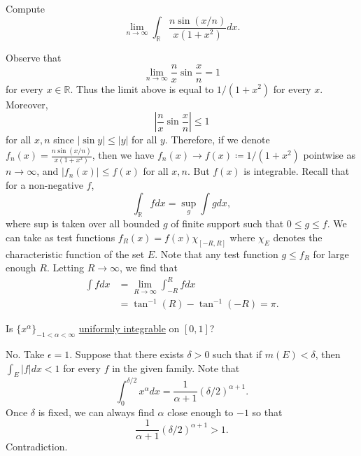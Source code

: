  \begin{exercise}
    Compute
    \begin{equation}
      \lim_{n\rightarrow\infty}\int_{\mathbb{R}}\frac{n\sin(x/n)}{x(1+x^{2})}dx.
    \end{equation}
  \end{exercise}
  \begin{solution}
    Observe that
    \begin{equation}
      \lim_{n\rightarrow\infty}\frac{n}{x}\sin\frac{x}{n}=1
    \end{equation}
    for every $x \in \mathbb{R}$. Thus the limit above is equal to $1/(1+x^{2})$ for every $x$. Moreover,
    \begin{equation}
      \left|\frac{n}{x}\sin\frac{x}{n}\right|\le1
    \end{equation}
    for all $x, n$ since $|\sin y| \le |y|$ for all $y$. Therefore, if we denote $f_n(x) = \frac{n \sin(x/n)}{x(1+x^2)}$, then we have $f_n(x) \rightarrow f(x) \coloneqq 1/(1+x^2)$ pointwise as $n \rightarrow \infty$, and $|f_n(x)| \le f(x)$ for all $x, n$. But $f(x)$ is integrable. Recall that for a non-negative $f$,
    \begin{equation}
      \int_{\mathbb{R}} f dx = \sup_g \int g dx,
    \end{equation}
    where sup is taken over all bounded $g$ of finite support such that $0 \le g \le f$. We can take as test functions $f_R(x) = f(x)\chi_{[-R,R]}$ where $\chi_E$ denotes the characteristic function of the set $E$. Note that any test function $g \le f_R$ for large enough $R$. Letting $R \rightarrow \infty$, we find that
    \begin{align}
      \int f dx &= \lim_{R\rightarrow\infty} \int_{-R}^{R} f dx \\
      &= \tan^{-1}(R) - \tan^{-1}(-R) = \pi.
    \end{align}
  \end{solution}

  \begin{exercise}
    Is $\{x^\alpha\}_{-1 < \alpha < \infty}$ \hyperref[def:uniformly-integrable]{uniformly integrable} on $[0, 1]$?
  \end{exercise}
  \begin{solution}
    No. Take $\epsilon = 1$. Suppose that there exists $\delta > 0$ such that if $m(E) < \delta$, then $\int_E |f| dx < 1$ for every $f$ in the given family. Note that
    \begin{equation}
      \int_{0}^{\delta/2} x^\alpha dx = \frac{1}{\alpha + 1}(\delta/2)^{\alpha+1}.
    \end{equation}
    Once $\delta$ is fixed, we can always find $\alpha$ close enough to $-1$ so that
    \begin{equation}
      \frac{1}{\alpha + 1}(\delta/2)^{\alpha+1} > 1.
    \end{equation}
    Contradiction.
  \end{solution}

